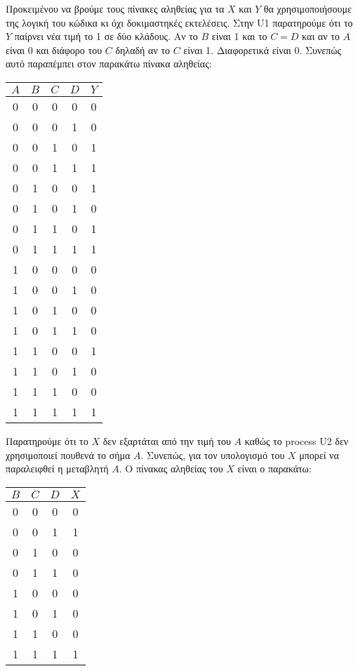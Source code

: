 \documentclass[11pt, a4paper]{report}
\begin{document}
\inputminted{vhdl}{./code/part-1/prompt.vhdl}

Προκειμένου να βρούμε τους πίνακες αληθείας για τα $X$ και $Y$ θα χρησιμοποιήσουμε της λογική του κώδικα κι όχι δοκιμαστηκές εκτελέσεις.
Στην U1 παρατηρούμε ότι το $Y$ παίρνει νέα τιμή το 1 σε δύο κλάδους.
Αν το $B$ είναι 1 και το $C = D$ και αν το $A$ είναι 0 και διάφορο του $C$ δηλαδή αν το $C$ είναι 1.
Διαφορετικά είναι 0. Συνεπώς αυτό παραπέμπει στον παρακάτω πίνακα αληθείας:
\begin{center}
	\begin{tabular} {|c|c|c|c|c|}
		\hline
		$A$ & $B$ & $C$ & $D$ & $Y$ \\
		\hline
		0   & 0   & 0   & 0   & 0   \\
		0   & 0   & 0   & 1   & 0   \\
		0   & 0   & 1   & 0   & 1   \\
		0   & 0   & 1   & 1   & 1   \\
		0   & 1   & 0   & 0   & 1   \\
		0   & 1   & 0   & 1   & 0   \\
		0   & 1   & 1   & 0   & 1   \\
		0   & 1   & 1   & 1   & 1   \\
		1   & 0   & 0   & 0   & 0   \\
		1   & 0   & 0   & 1   & 0   \\
		1   & 0   & 1   & 0   & 0   \\
		1   & 0   & 1   & 1   & 0   \\
		1   & 1   & 0   & 0   & 1   \\
		1   & 1   & 0   & 1   & 0   \\
		1   & 1   & 1   & 0   & 0   \\
		1   & 1   & 1   & 1   & 1   \\
		\hline
	\end{tabular}
\end{center}

Παρατηρούμε ότι το $X$ δεν εξαρτάται από την τιμή του $A$ καθώς το process U2 δεν χρησιμοποιεί πουθενά το σήμα $A$.
Συνεπώς, για τον υπολογισμό του $X$ μπορεί να παραλειφθεί η μεταβλητή $A$. Ο πίνακας αληθείας του $X$ είναι ο παρακάτω:
\begin{center}
	\begin{tabular} {|c|c|c|c|}
		\hline
		$B$ & $C$ & $D$ & $X$ \\
		\hline
		0   & 0   & 0   & 0   \\
		0   & 0   & 1   & 1   \\
		0   & 1   & 0   & 0   \\
		0   & 1   & 1   & 0   \\
		1   & 0   & 0   & 0   \\
		1   & 0   & 1   & 0   \\
		1   & 1   & 0   & 0   \\
		1   & 1   & 1   & 1   \\
		\hline
	\end{tabular}
\end{center}
\end{document}
